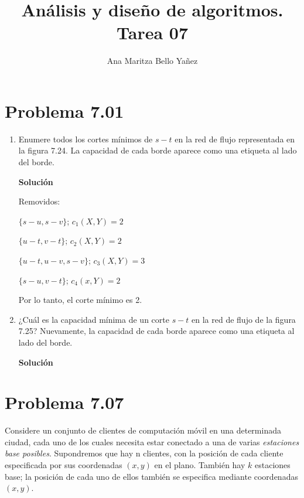 \documentclass{article}
\begin{document}
\title{Análisis y diseño de algoritmos. \\ Tarea 07}
\author{Ana Maritza Bello Yañez}
\maketitle
\setlength{\parindent}{0pt}
\setlength{\parskip}{1em}

\section*{Problema 7.01}

\begin{enumerate}

\item Enumere todos los cortes mínimos de $s-t$ en la red de flujo representada en
la figura 7.24. La capacidad de cada borde aparece como una etiqueta al lado del
borde.

\textbf{Solución}


Removidos:


$\{s-u, s-v\}$;     $c_1(X,Y) = 2$


$\{u-t,v-t\}$;      $c_2(X,Y) = 2$


$\{ u-t, u-v, s-v \}$;  $c_3(X,Y) = 3$


$\{ s-u, v-t\}$;    $c_4(x,Y) = 2$

Por lo tanto, el corte mínimo es 2.

\item ¿Cuál es la capacidad mínima de un corte $s-t$ en la red de flujo de la
figura 7.25? Nuevamente, la capacidad de cada borde aparece como una etiqueta al
lado del borde.

\textbf{Solución}


\end{enumerate}    

\section*{Problema 7.07}

Considere un conjunto de clientes de computación móvil en una determinada
ciudad, cada uno de los cuales necesita estar conectado a una de varias
\textit{estaciones base posibles}. Supondremos que hay n clientes, con la
posición de cada cliente especificada por sus coordenadas $(x, y)$ en el plano.
También hay $k$ estaciones base; la posición de cada uno de ellos también se
especifica mediante coordenadas $(x, y)$.
\end{document}
